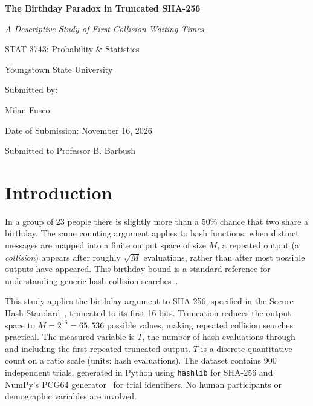 \documentclass[12pt,letterpaper]{article}
\begin{document}
\begin{titlepage}
\centering
\vspace*{2cm}
{\LARGE\bfseries The Birthday Paradox in Truncated SHA-256\par}
\vspace{0.4cm}
{\Large\itshape A Descriptive Study of First-Collision Waiting Times\par}
\vspace{2cm}
{\large STAT 3743: Probability \& Statistics\par}
{\large Youngstown State University\par}
\vspace{1.5cm}
{\large Submitted by:\par}
{\large Milan Fusco\par}
\vspace{1cm}
{\large Date of Submission: November 16, 2026\par}
\vspace{1.5cm}
{\large Submitted to Professor B. Barbush\par}
\vfill
\end{titlepage}

\setcounter{page}{1}

\section{Introduction}

In a group of 23 people there is slightly more than a 50\% chance that two share a birthday. The same counting argument applies to hash functions: when distinct messages are mapped into a finite output space of size $M$, a repeated output (a \emph{collision}) appears after roughly $\sqrt{M}$ evaluations, rather than after most possible outputs have appeared. This birthday bound is a standard reference for understanding generic hash-collision searches~\cite{paar2024}.

This study applies the birthday argument to SHA-256, specified in the Secure Hash Standard~\cite{fips1804}, truncated to its first 16 bits. Truncation reduces the output space to $M = 2^{16} = 65{,}536$ possible values, making repeated collision searches practical. The measured variable is $T$, the number of hash evaluations through and including the first repeated truncated output. $T$ is a discrete quantitative count on a ratio scale (units: hash evaluations). The dataset contains 900 independent trials, generated in Python using \texttt{hashlib} for SHA-256 and NumPy's PCG64 generator~\cite{numpyPCG64} for trial identifiers. No human participants or demographic variables are involved.
\end{document}

